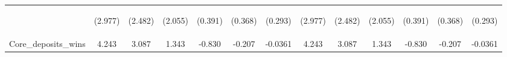\documentclass[]{article}
\begin{document}
\begin{center}
\begin{tabular}{lcccccccccccc}
\vspace{4pt} & \begin{footnotesize}(2.977)\end{footnotesize} & \begin{footnotesize}(2.482)\end{footnotesize} & \begin{footnotesize}(2.055)\end{footnotesize} & \begin{footnotesize}(0.391)\end{footnotesize} & \begin{footnotesize}(0.368)\end{footnotesize} & \begin{footnotesize}(0.293)\end{footnotesize} & \begin{footnotesize}(2.977)\end{footnotesize} & \begin{footnotesize}(2.482)\end{footnotesize} & \begin{footnotesize}(2.055)\end{footnotesize} & \begin{footnotesize}(0.391)\end{footnotesize} & \begin{footnotesize}(0.368)\end{footnotesize} & \begin{footnotesize}(0.293)\end{footnotesize} \\
Core\_deposits\_wins & 4.243 & 3.087 & 1.343 & -0.830 & -0.207 & -0.0361 & 4.243 & 3.087 & 1.343 & -0.830 & -0.207 & -0.0361 \\

\end{tabular}
\end{center}
\end{document}
